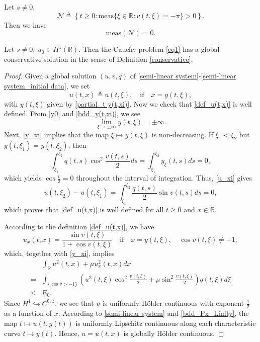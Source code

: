 \documentclass[10pt,a4paper]{amsart}
\begin{document}
	\begin{lemm}\label{lemma_N}
		Let $s\neq0$, 
		$$\mathcal{N}\triangleq\left\{t\geq0:\mathrm{meas}\{\xi\in \mathbb{R}:v(t,\xi)=-\pi\}>0\right\}.$$
		Then we have
		$$\mathrm{meas}(\mathcal{N})=0.$$
	\end{lemm}

	\begin{theo}
		Let $s\neq0,\ u_0\in H^1(\mathbb{R})$. Then the Cauchy problem \eqref{eq1} has a global conservative solution in the sense of Definition \ref{conservative}.
	\end{theo}

	\begin{proof}
		Given a global solution $(u,v,q)$ of \eqref{semi-linear system}-\eqref{semi-linear system_initial data}, we set
		\begin{equation}\label{def_u(t,x)}
			u(t,x)\triangleq u(t,\xi),\quad\mathrm{if}\quad x=y(t,\xi),
		\end{equation}
		with $y(t,\xi)$ given by \eqref{partial_t y(t,xi)}. Now we check that \eqref{def_u(t,x)} is well defined. From \eqref{y0} and \eqref{bdd_y(t,xi)}, we see
		$$\lim_{\xi\to\pm\infty}y(t,\xi)=\pm\infty.$$
		Next, \eqref{y_xi} implies that the map $\xi\mapsto y(t,\xi)$ is non-decreasing. If $\xi_1<\xi_2$ but $y(t,\xi_1)=y(t,\xi_2)$, then
		$$\int_{\xi_1}^{\xi_2}q(t,s)\cos^2\frac{v(t,s)}{2}ds=\int_{\xi_1}^{\xi_2}y_\xi(t,s)ds=0,$$
		which yields $\cos\frac{v}{2}=0$ throughout the interval of integration. Thus, \eqref{u_xi} gives
		$$u(t,\xi_2)-u(t,\xi_1)=\int_{\xi_1}^{\xi_2}\frac{q(t,s)}{2}\sin v(t,s)ds=0,$$
		which proves that \eqref{def_u(t,x)} is well defined for all $t\geq0$ and $x\in\mathbb{R}$.
		
		According to the definition \eqref{def_u(t,x)}, we have
		\begin{equation*}
			u_x(t,x)=\frac{\sin v(t,\xi)}{1+\cos v(t,\xi)}\quad\mathrm{if}\quad x=y(t,\xi),\quad\cos v(t,\xi)\neq-1,
		\end{equation*}
		which, together with \eqref{y_xi}, implies
		\begin{align*}
			&\int_{\mathbb{R}}u^{2}(t,x)+\mu u_{x}^{2}(t,x)dx \\
			=&\int_{\{\cos v>-1\}}\left(u^2(t,\xi)\cos^2\frac{v(t,\xi)}{2}+\mu\sin^2\frac{v(t,\xi)}{2}\right)q(t,\xi)d\xi \\
			\leq& E_{0}.
		\end{align*}
		Since $H^1\hookrightarrow C^{0,\frac{1}{2}}$, we see that $u$ is uniformly H\"{o}lder continuous with exponent $\frac{1}{2}$ as a function of $x$. According to \eqref{semi-linear system} and \eqref{bdd_Px_Linfty}, the map $t\mapsto u(t,y(t))$ is uniformly Lipschitz continuous along each characteristic curve $t\mapsto y(t)$. Hence, $u=u(t,x)$ is globally H\"{o}lder continuous.
		

\end{proof}
\end{document}
